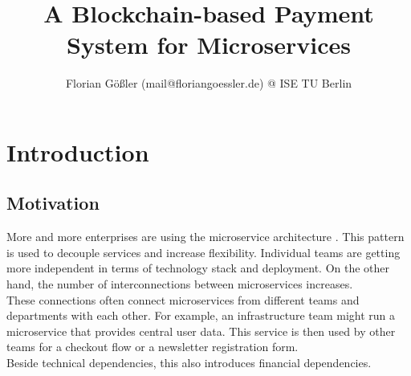 \documentclass[a4paper,12pt]{scrartcl}
\title{
A Blockchain-based Payment System for Microservices
}
\author{Florian G\"o\ss{}ler (mail@floriangoessler.de) @ ISE TU Berlin%
}
\begin{document}
    
   	\thispagestyle{empty}
    \cleardoublepage

    
    \thispagestyle{empty}
    \cleardoublepage

    
    \thispagestyle{empty}
    \cleardoublepage

    
    \thispagestyle{empty}
    \cleardoublepage

    
    \thispagestyle{empty}
    \cleardoublepage

    \tableofcontents
    \thispagestyle{empty}

    \cleardoublepage
    \listoffigures
    \thispagestyle{empty}


\newpage

\section{Introduction}

\subsection{Motivation}

More and more enterprises are using the microservice architecture \cite{web1}. This pattern is used to decouple services and increase flexibility. Individual teams are getting more independent in terms of technology stack and deployment. On the other hand, the number of interconnections between microservices increases.\\
These connections often connect microservices from different teams and departments with each other. For example, an infrastructure team might run a microservice that provides central user data. This service is then used by other teams for a checkout flow or a newsletter registration form.\\

Beside technical dependencies, this also introduces financial dependencies.\\
\end{document}
